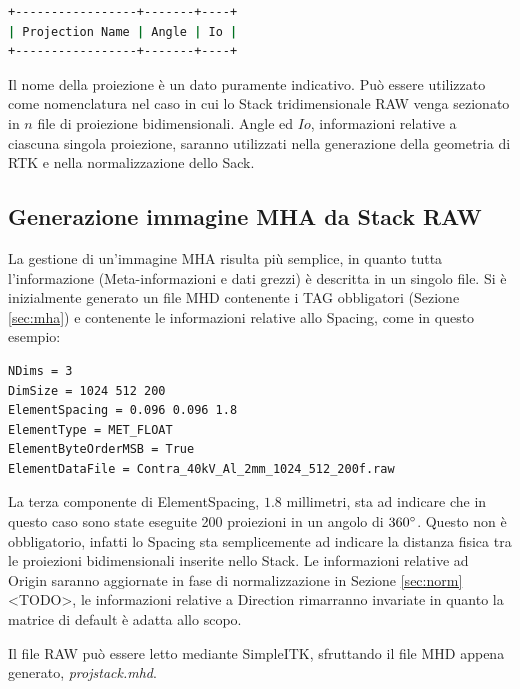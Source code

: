 \documentclass[a4paper,12pt, doubleside]{report}
\begin{document}
                    \begin{lstlisting}[language=bash, frame=bt] 
+-----------------+-------+----+
| Projection Name | Angle | Io |
+-----------------+-------+----+
                    \end{lstlisting}
                    
                    Il nome della proiezione è un dato puramente indicativo. Può essere utilizzato come nomenclatura nel caso in cui lo Stack tridimensionale RAW venga sezionato in $n$ file di proiezione bidimensionali. Angle ed $Io$, informazioni relative a ciascuna singola proiezione, saranno utilizzati nella generazione della geometria di RTK e nella normalizzazione dello Sack.
                    
            \subsection{Generazione immagine MHA da Stack RAW}
                \label{sec:conversione}
                \par
                    La gestione di un'immagine MHA risulta più semplice, in quanto tutta l'informazione (Meta-informazioni e dati grezzi) è descritta in un singolo file. Si è inizialmente generato un file MHD contenente i TAG obbligatori (Sezione \ref{sec:mha}) e contenente le informazioni relative allo Spacing, come in questo esempio:
                    
                    \begin{lstlisting}[language=bash, frame=bt]
NDims = 3
DimSize = 1024 512 200
ElementSpacing = 0.096 0.096 1.8
ElementType = MET_FLOAT
ElementByteOrderMSB = True
ElementDataFile = Contra_40kV_Al_2mm_1024_512_200f.raw
                    \end{lstlisting}
                    
                    La terza componente di ElementSpacing, $1.8$ millimetri, sta ad indicare che in questo caso sono state eseguite 200 proiezioni in un angolo di $360\degree$. Questo non è obbligatorio, infatti lo Spacing sta semplicemente ad indicare la distanza fisica tra le proiezioni bidimensionali inserite nello Stack. Le informazioni relative ad Origin saranno aggiornate in fase di normalizzazione in Sezione \ref{sec:norm} <TODO>, le informazioni relative a Direction rimarranno invariate in quanto la matrice di default è adatta allo scopo.
                    
                \bigskip
                \par
                    Il file RAW può essere letto mediante SimpleITK, sfruttando il file MHD appena generato, \textit{proj\textunderscore stack.mhd}.
                   
\end{document}
